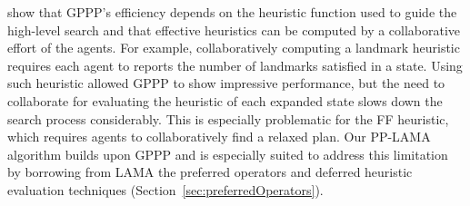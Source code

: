 \documentclass[letterpaper]{article}
\theoremstyle{definition}
\begin{document}


\cite{maliah2014privacyPreserving} show that GPPP's efficiency depends on the heuristic function used to guide the high-level search and that effective heuristics can be computed by a collaborative effort of the agents. For example, collaboratively computing a landmark heuristic requires each agent to reports the number of landmarks satisfied in a state. Using such heuristic allowed GPPP to show impressive performance, but the need to collaborate for evaluating the heuristic of each expanded state slows down the search process considerably. 
This is especially problematic for the FF heuristic, which requires agents to collaboratively find a relaxed plan.  
Our PP-LAMA algorithm builds upon GPPP and is especially suited to address this limitation by borrowing from LAMA the preferred operators and deferred heuristic evaluation techniques (Section~\ref{sec:preferredOperators}). 


\end{document}
